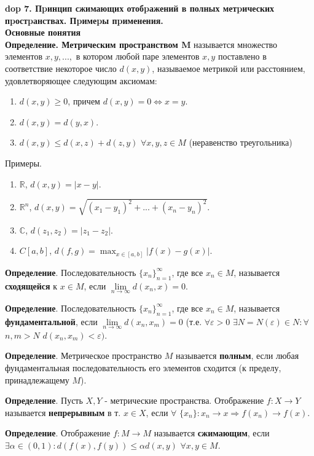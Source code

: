 \textbf{\LARGE dop 7. Пpинцип сжимающих отобpажений в полных метpических пpостpанствах. Пpимеpы пpименения.}  \\
\textbf{\large Основные понятия} \\
\textbf{Определение. Метрическим пространством M}
называется множество элементов $x, y, ...,$ в котором любой паре элементов $x, y$ поставлено в соответствие некоторое число $d(x, y)$, называемое метрикой или расстоянием, удовлетворяющее следующим аксиомам:
\begin{enumerate}
    \item $d(x, y) \geq 0$, причем $d(x, y)=0 \iff x=y$.
    \item $d(x, y) = d(y, x)$.
    \item $d(x, y) \leq d(x, z) + d(z, y)$ $\forall x,y,z \in M$ (неравенство треугольника)
\end{enumerate}

Примеры.
\begin{enumerate}
    \item $\mathbb{R}$, $d(x,y)=|x-y|$.
    \item $\mathbb{R}^n$, $d(x, y) = \sqrt{(x_1-y_1)^2+...+(x_n-y_n)^2}$.
    \item $\mathbb{C}$, $d(z_1, z_2) = |z_1-z_2|$.
    \item $C[a,b]$, $d(f, g) = \max_{x \in [a,b]}|f(x)-g(x)|$.
\end{enumerate}

\textbf{Определение}. Последовательность $\{x_n\}_{n=1}^{\infty}$, где все $x_n \in M$, называется \textbf{сходящейся} к $x \in M$, если $\lim\limits_{n \to \infty} d(x_n, x) = 0$.

\textbf{Определение}. Последовательность $\{x_n\}_{n=1}^{\infty}$, где все $x_n \in M$, называется \textbf{фундаментальной}, если $\lim\limits_{n \to \infty} d(x_n, x_m) = 0$ (т.е. $\forall \varepsilon > 0$ $\exists N = N(\varepsilon) \in N: \forall$ $n,m > N$ $d(x_n, x_m) < \varepsilon)$.

\textbf{Определение}. Метрическое пространство $M$ называется \textbf{полным}, если любая фундаментальная последовательность его элементов сходится (к пределу, принадлежащему $M$).

\textbf{Определение}. Пусть $X, Y$ - метрические пространства. Отображение $f : X \xrightarrow{} Y$ называется
\textbf{непрерывным} в т. $x \in X$, если $\forall$ $ \{x_n\}:x_n \rightarrow x \Rightarrow f(x_n) \xrightarrow{} f(x)$.

\textbf{Определение}. Отображение $f : M \xrightarrow{} M$ называется
\textbf{сжимающим}, если $\exists \alpha \in (0,1): d(f(x), f(y)) \leq \alpha d(x,y)$ $\forall x,y \in M$.

